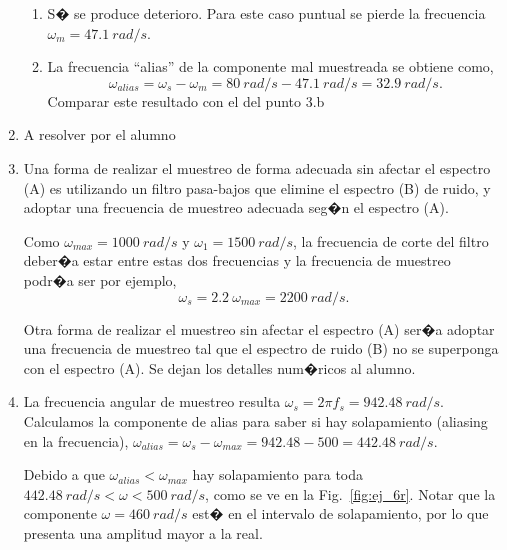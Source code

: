 \documentclass[10pt,a4paper]{article}
\begin{document}
\begin{enumerate}
\begin{enumerate}
\item
S� se produce deterioro. Para este caso puntual se pierde la frecuencia $\omega_m=47.1~rad/s$.

\item
La frecuencia ``alias'' de la componente mal muestreada se obtiene como,
\begin{equation}
\omega_{alias}=\omega_s-\omega_m=80~rad/s-47.1~rad/s=32.9~rad/s.
\end{equation}
Comparar este resultado con el del punto 3.b
\end{enumerate}


\item A resolver por el alumno

\item
Una forma de realizar el muestreo de forma adecuada sin afectar el espectro (A) es utilizando un filtro pasa-bajos que elimine el espectro (B) de ruido, y adoptar una frecuencia de muestreo adecuada seg�n el espectro (A). 

Como $\omega_{max} = 1000~rad/s$ y $\omega_1=1500~rad/s$, la frecuencia de corte del filtro deber�a estar entre estas dos frecuencias y la frecuencia de muestreo podr�a ser por ejemplo,
\begin{equation}
\omega_s = 2.2~\omega_{max} = 2200~rad/s.
\end{equation}

Otra forma de realizar el muestreo sin afectar el espectro (A) ser�a adoptar una frecuencia de muestreo tal que el espectro de ruido (B) no se superponga con el espectro (A). Se dejan los detalles num�ricos al alumno.


\item La frecuencia angular de muestreo resulta $\omega_s=2\pi f_s=942.48 ~ rad/s$. Calculamos la componente de alias 
para saber si hay solapamiento (aliasing en la frecuencia), 
$\omega_{alias}=\omega_s-\omega_{max}=942.48-500=442.48~rad/s$. 

Debido a que $\omega_{alias}<\omega_{max}$ hay 
solapamiento para toda $442.48~rad/s<\omega<500~rad/s$, como se ve en la Fig.~\ref{fig:ej_6r}. Notar que la 
componente $\omega=460~rad/s$ est� en el intervalo de solapamiento, por lo que presenta una amplitud mayor a la real.


\end{enumerate}
\end{document}
